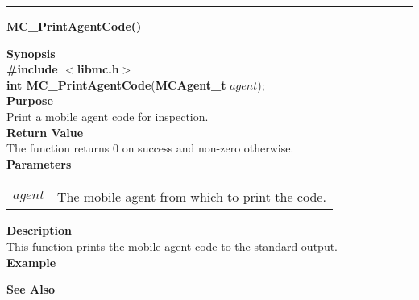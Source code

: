 \noindent
\vspace{5pt}
\rule{6.5in}{0.015in}
\noindent
{\LARGE \bf MC\_PrintAgentCode()}\\
{}

\noindent
{\bf Synopsis}\\
{\bf \#include $<$libmc.h$>$}\\
{\bf int MC\_PrintAgentCode}({\bf MCAgent\_t} $agent$);\\

\noindent
{\bf Purpose}\\
Print a mobile agent code for inspection.\\

\noindent
{\bf Return Value}\\
The function returns 0 on success and non-zero otherwise.\\

\noindent
{\bf Parameters}
\vspace{-0.1in}
\begin{description}
\item               
\begin{tabular}{p{10 mm}p{145 mm}}
$agent$ & The mobile agent from which to print the code.
\end{tabular}
\end{description}

\noindent
{\bf Description}\\
This function prints the mobile agent code to the standard output.\\

\noindent
{\bf Example}\\
\noindent

\noindent
{\bf See Also}\\

